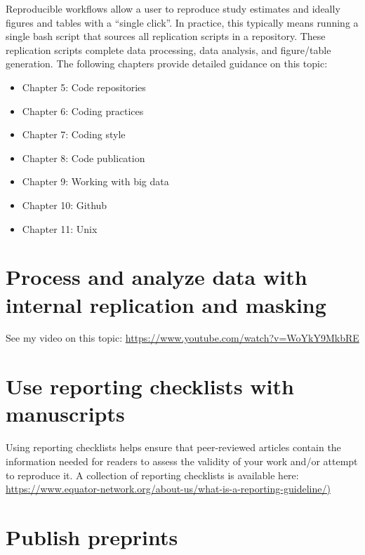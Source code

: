 \documentclass[
]{book}
\providecommand{\tightlist}{%
  \setlength{\itemsep}{0pt}\setlength{\parskip}{0pt}}
\begin{document}
Reproducible workflows allow a user to reproduce study estimates and ideally figures and tables with a ``single click''. In practice, this typically means running a single bash script that sources all replication scripts in a repository. These replication scripts complete data processing, data analysis, and figure/table generation. The following chapters provide detailed guidance on this topic:

\begin{itemize}
\tightlist
\item
  Chapter 5: Code repositories
\item
  Chapter 6: Coding practices
\item
  Chapter 7: Coding style
\item
  Chapter 8: Code publication
\item
  Chapter 9: Working with big data
\item
  Chapter 10: Github
\item
  Chapter 11: Unix
\end{itemize}

\hypertarget{process-and-analyze-data-with-internal-replication-and-masking}{%
\section{Process and analyze data with internal replication and masking}\label{process-and-analyze-data-with-internal-replication-and-masking}}

See my video on this topic: \url{https://www.youtube.com/watch?v=WoYkY9MkbRE}

\hypertarget{use-reporting-checklists-with-manuscripts}{%
\section{Use reporting checklists with manuscripts}\label{use-reporting-checklists-with-manuscripts}}

Using reporting checklists helps ensure that peer-reviewed articles contain the information needed for readers to assess the validity of your work and/or attempt to reproduce it. A collection of reporting checklists is available here: \href{https://www.equator-network.org/about-us/what-is-a-reporting-guideline/}{https://www.equator-network.org/about-us/what-is-a-reporting-guideline/)}

\hypertarget{publish-preprints}{%
\section{Publish preprints}\label{publish-preprints}}
\end{document}
